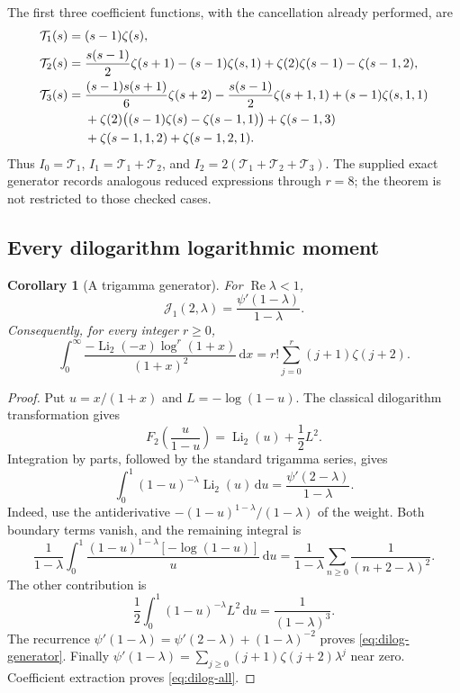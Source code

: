\documentclass[11pt]{article}
\numberwithin{equation}{section}
\newtheorem{corollary}[theorem]{Corollary}
\theoremstyle{definition}
\DeclareMathOperator{\Li}{Li}
\DeclareMathOperator{\Rea}{Re}
\newcommand{\dd}{\,\mathrm d}
\newcommand{\JJ}{\mathcal J}
\begin{document}
The first three coefficient functions, with the cancellation already performed, are
\begin{align}
 \mathcal T_1(s)={}&(s-1)\zeta(s),\label{eq:T1}\\
 \mathcal T_2(s)={}&\frac{s(s-1)}2\zeta(s+1)-(s-1)\zeta(s,1)
       +\zeta(2)\zeta(s-1)-\zeta(s-1,2),\label{eq:T2}\\
 \mathcal T_3(s)={}&\frac{(s-1)s(s+1)}6\zeta(s+2)
 -\frac{s(s-1)}2\zeta(s+1,1)+(s-1)\zeta(s,1,1)\notag\\
 &+\zeta(2)\bigl((s-1)\zeta(s)-\zeta(s-1,1)\bigr)
 +\zeta(s-1,3)\notag\\
 &+\zeta(s-1,1,2)+\zeta(s-1,2,1).\label{eq:T3}
\end{align}
Thus $I_0=\mathcal T_1$, $I_1=\mathcal T_1+\mathcal T_2$, and $I_2=2(\mathcal T_1+\mathcal T_2+\mathcal T_3)$. The supplied exact generator records analogous reduced expressions through $r=8$; the theorem is not restricted to those checked cases.

\subsection{Every dilogarithm logarithmic moment}
\begin{corollary}[A trigamma generator]\label{cor:dilog-all}
For $\Rea\lambda<1$,
\begin{equation}\label{eq:dilog-generator}
 \JJ_1(2,\lambda)=\frac{\psi'(1-\lambda)}{1-\lambda}.
\end{equation}
Consequently, for every integer $r\ge0$,
\begin{equation}\label{eq:dilog-all}
 \boxed{\displaystyle
 \int_0^\infty\frac{-\Li_2(-x)\log^r(1+x)}{(1+x)^2}\dd x
 =r!\sum_{j=0}^r(j+1)\zeta(j+2).}
\end{equation}
\end{corollary}
\begin{proof}
Put $u=x/(1+x)$ and $L=-\log(1-u)$. The classical dilogarithm transformation \cite{DLMFpoly} gives
\[
 F_2\!\left(\frac{u}{1-u}\right)=\Li_2(u)+\frac12L^2.
\]
Integration by parts, followed by the standard trigamma series, gives
\[
 \int_0^1(1-u)^{-\lambda}\Li_2(u)\dd u
 =\frac{\psi'(2-\lambda)}{1-\lambda}.
\]
Indeed, use the antiderivative $-(1-u)^{1-\lambda}/(1-\lambda)$ of the weight. Both boundary terms vanish, and the remaining integral is
\[
 \frac1{1-\lambda}\int_0^1\frac{(1-u)^{1-\lambda}[-\log(1-u)]}{u}\dd u
 =\frac1{1-\lambda}\sum_{n\ge0}\frac1{(n+2-\lambda)^2}.
\] The other contribution is
\[
 \frac12\int_0^1(1-u)^{-\lambda}L^2\dd u=\frac1{(1-\lambda)^3}.
\]
The recurrence $\psi'(1-\lambda)=\psi'(2-\lambda)+(1-\lambda)^{-2}$ proves \eqref{eq:dilog-generator}. Finally
$\psi'(1-\lambda)=\sum_{j\ge0}(j+1)\zeta(j+2)\lambda^j$ near zero. Coefficient extraction proves \eqref{eq:dilog-all}.
\end{proof}
\end{document}
